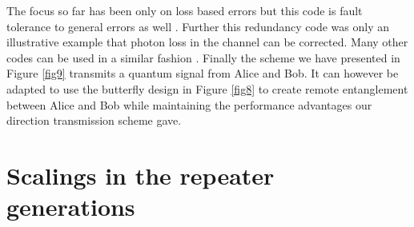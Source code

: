\documentclass[twocolumn, aps, rmp, amsmath, amssymb, nofootinbib, superscriptaddress, longbibliography, floatfix, table-of-contents, eqsecnum]{revtex4-1}
\begin{document}
The focus so far has been only on loss based errors but this code is fault tolerance to general errors as well \cite{MKLLJ14}. Further this redundancy code was only an illustrative example that photon loss in the channel can be corrected. Many other codes can be used in a similar fashion \cite{munro12,Fowler10,MKLLJ14}. Finally the scheme we have presented in Figure \ref{fig9} transmits a quantum signal from Alice and Bob. It can however be adapted to use the butterfly design in Figure \ref{fig8} to create remote entanglement between  Alice and Bob while maintaining the performance advantages our direction transmission scheme gave. 

\section{Scalings in the repeater generations}
\end{document}

